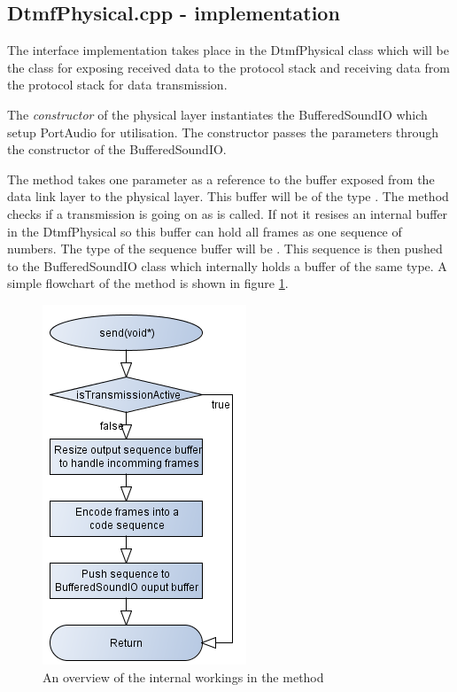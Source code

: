 	\subsection{DtmfPhysical.cpp - implementation}
	The interface implementation takes place in the DtmfPhysical class which will be the class for exposing received data to the protocol stack
	and receiving data from the protocol stack for data transmission.
	
	The \textit{constructor} of the physical layer instantiates the BufferedSoundIO which setup PortAudio for utilisation. The constructor passes the
	parameters through the constructor of the BufferedSoundIO.
	
	The  method takes one parameter as a reference to the buffer exposed from the data link layer to the physical layer. This buffer
	will be of the type . The  method checks if a transmission is going on as  is called.
	If not it resises an internal buffer in the DtmfPhysical so this buffer can hold all frames as one sequence of numbers. The type of 
	the sequence buffer will be . This sequence is then pushed to the BufferedSoundIO class which
	internally holds a buffer of the same type. A simple flowchart of the  method is shown in figure \ref{fig:physical_send}.
	
	\begin{figure}[htb]
		\begin{center}
		\includegraphics[scale=0.7,trim=0 0 0 0]{content/graphics/physical/physical_send.png}%
		\caption{An overview of the internal workings in the  method}
		\label{fig:physical_send}
		\end{center}
	\end{figure}
	
